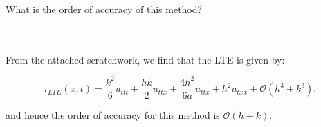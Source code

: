 What is the order of accuracy of this method?

\begin{solution}\ \\\\

    From the attached scratchwork, we find that the LTE is given by:

    $$
    \tau_{LTE}(x, t) = \frac{k^2}{6} u_{ttt} + \frac{hk}{2} u_{ttx} + \frac{4h^2}{6a} u_{ttx} + h^2 u_{txx} + \mathcal{O}(h^3 + k^3).
    $$

    and hence the order of accuracy for this method is $\mathcal{O}(h + k)$.
    \ \\
\end{solution}